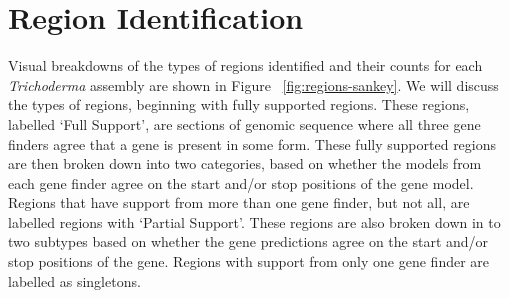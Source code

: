 \section{Region Identification}\label{section:regions}

Visual breakdowns of the types of regions identified and their counts
for each \textit{Trichoderma} assembly are shown in Figure
~\ref{fig:regions-sankey}. We will discuss the types of regions,
beginning with fully supported regions. These regions, labelled `Full
Support', are sections of genomic sequence where all three gene
finders agree that a gene is present in some form. These fully
supported regions are then broken down into two categories, based on
whether the models from each gene finder agree on the start
and/or stop positions of the gene model. Regions that have support
from more than one gene finder, but not all, are labelled regions with
`Partial Support'. These regions are also broken down in to two
subtypes based on whether the gene predictions agree on the
start and/or stop positions of the gene. Regions with support from
only one gene finder are labelled as singletons.

